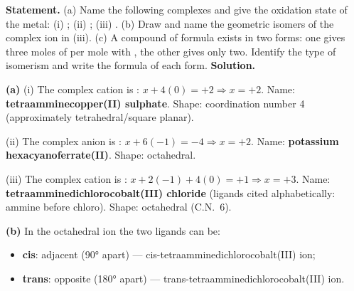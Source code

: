 \documentclass[11pt]{article}
\begin{document}
\begin{exoresolu}
\textbf{Statement.} (a) Name the following complexes and give the oxidation state of the metal: (i) ; (ii) ; (iii) . (b) Draw and name the geometric isomers of the complex ion in (iii). (c) A compound of formula  exists in two forms: one gives three moles of  per mole with , the other gives only two. Identify the type of isomerism and write the formula of each form.
\tcblower
\textbf{Solution.}

\textbf{(a)} (i) The complex cation is : $x + 4(0) = +2 \Rightarrow x = +2$. Name: \textbf{tetraamminecopper(II) sulphate}. Shape: coordination number 4 (approximately tetrahedral/square planar).

(ii) The complex anion is : $x + 6(-1) = -4 \Rightarrow x = +2$. Name: \textbf{potassium hexacyanoferrate(II)}. Shape: octahedral.

(iii) The complex cation is \ce{[CoCl2(NH3)4]+}: $x + 2(-1) + 4(0) = +1 \Rightarrow x = +3$. Name: \textbf{tetraamminedichlorocobalt(III) chloride} (ligands cited alphabetically: ammine before chloro). Shape: octahedral (C.N.\ 6).

\textbf{(b)} In the octahedral ion \ce{[CoCl2(NH3)4]+} the two  ligands can be:
\begin{itemize}
\item \textbf{cis}: adjacent (90° apart) — cis-tetraamminedichlorocobalt(III) ion;
\item \textbf{trans}: opposite (180° apart) — trans-tetraamminedichlorocobalt(III) ion.
\end{itemize}
\begin{center}
\end{center}


\end{exoresolu}
\end{document}
